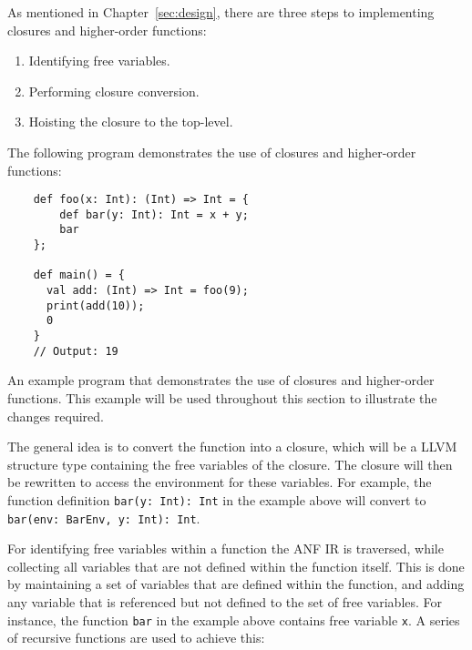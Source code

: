 As mentioned in Chapter~\ref{sec:design}, there are three steps to implementing closures and
higher-order functions:

\begin{enumerate}
    \singlespacing
    \item Identifying free variables.
    \item Performing closure conversion.
    \item Hoisting the closure to the top-level.
\end{enumerate}

The following program demonstrates the use of closures and higher-order functions:

\begin{tcolorbox}
    \begin{verbatim}
    def foo(x: Int): (Int) => Int = {
        def bar(y: Int): Int = x + y;
        bar
    };

    def main() = {
      val add: (Int) => Int = foo(9);
      print(add(10));
      0
    }
    // Output: 19
    \end{verbatim}
    \tcblower
    \footnotesize
    An example program that demonstrates the use of closures and higher-order functions.
    This example will be used throughout this section to illustrate the changes required.
\end{tcolorbox}

The general idea is to convert the function into a closure, which will be a LLVM structure type
containing the free variables of the closure. The closure will then be rewritten to access the
environment for these variables. For example, the function definition
\texttt{bar(y: Int): Int}
in the example above will convert to
\texttt{bar(env: BarEnv, y: Int): Int}.

For identifying free variables within a function the ANF IR is traversed, while collecting all
variables that are not defined within the function itself. This is done by maintaining a set of
variables that are defined within the function, and adding any variable that is referenced but not
defined to the set of free variables. For instance, the function \texttt{bar} in the example above
contains free variable \texttt{x}. A series of recursive functions are used to achieve this:

